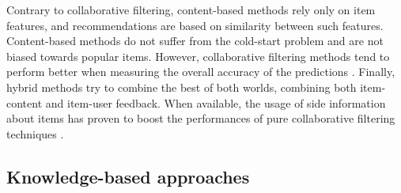 Contrary to collaborative filtering, content-based methods \citep{Mooney1999} rely only on item features, and recommendations are based on similarity between such features. Content-based methods do not suffer from the cold-start problem and are not biased towards popular items. However, collaborative filtering methods tend to perform better when measuring the overall accuracy of the predictions \citep{pilaszy2009recommending}.
Finally, hybrid methods \citep{Burke2002} try to combine the best of both worlds, combining both item-content and item-user feedback. 
When available, the usage of side information about items has proven to boost the performances of pure collaborative filtering techniques \citep{Ning12}. %



\subsection{Knowledge-based approaches}
\label{sec:SOA:mir:recommendation:semantic}

